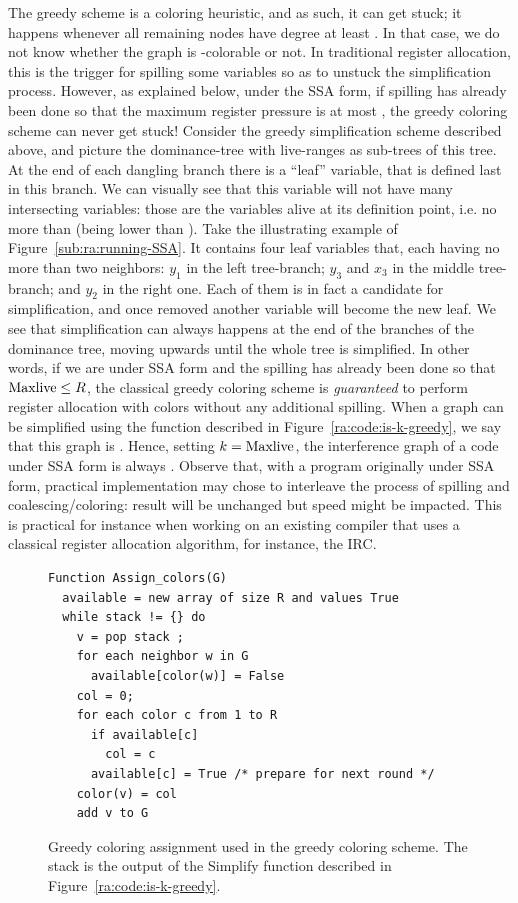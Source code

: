 {The greedy scheme is a coloring heuristic, and as such, it can get stuck;
it happens whenever all remaining nodes have degree at least \regs.
In that case, we do not know whether the graph is \regs-colorable or not.
In traditional register allocation, this is the trigger for spilling some variables so as to unstuck the simplification process.
However, as explained below, under the SSA form, if spilling has already been done so that the maximum register pressure is at most \regs, the greedy coloring scheme can never get stuck!
Consider the greedy simplification scheme described above, and picture the dominance-tree with live-ranges as sub-trees of this tree.
At the end of each dangling branch there is a ``leaf'' variable, that is defined last in this branch.
We can visually see that this variable will not have many intersecting variables:
those are the variables alive at its definition point, i.e. no more than  (\maxlive being lower than \regs).
Take the illustrating example of Figure~\ref{sub:ra:running-SSA}.
It contains four leaf variables that, each having no more than two neighbors:
$y_1$ in the left tree-branch; $y_3$ and $x_3$ in the middle tree-branch; and $y_2$ in the right one.
Each of them is in fact a candidate for simplification, and once removed another variable will become the new leaf.
We see that simplification can always happens at the end of the branches of the dominance tree, moving upwards until the whole tree is simplified.
In other words, if we are under SSA form and the spilling has already been done so that $\mathrm{Maxlive} \leq R$, the classical greedy coloring scheme is \emph{guaranteed} to perform register allocation with \regs colors without any additional spilling.
When a graph can be simplified using the function described in Figure~\ref{ra:code:is-k-greedy}, we say that this graph is .
Hence, setting $k=\mathrm{Maxlive}$, the interference graph of a code under SSA form is always . %
Observe that, with a program originally under SSA form, practical implementation may chose to interleave the process of spilling and coalescing/coloring:
result will be unchanged but speed might be impacted.
This is practical for instance when working on an existing compiler that uses a classical register allocation algorithm, for instance, the IRC.



\begin{figure}
\begin{verbatim}
Function Assign_colors(G)
  available = new array of size R and values True
  while stack != {} do
    v = pop stack ;
    for each neighbor w in G
      available[color(w)] = False
    col = 0;
    for each color c from 1 to R
      if available[c]
        col = c
      available[c] = True /* prepare for next round */
    color(v) = col
    add v to G
\end{verbatim}
\caption{Greedy coloring assignment used in the greedy coloring scheme. The stack is the output of the Simplify function described in Figure~\ref{ra:code:is-k-greedy}.}
\label{ra:code:assign-color}
\end{figure}


}
